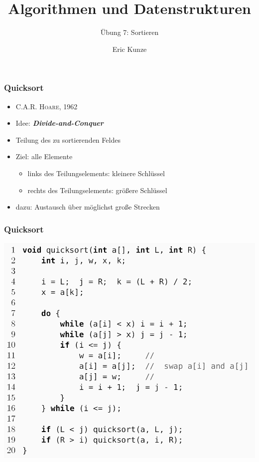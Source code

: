 \documentclass{beamer}
\begin{document}
	
	\title{Algorithmen und Datenstrukturen}
	\subtitle{Übung 7: Sortieren}
	\author{Eric Kunze}
	\date{} %

	\maketitle


\begin{frame} \frametitle{Quicksort}
	\begin{itemize}
		\item \textsc{C.A.R. Hoare}, 1962
		\item Idee: \textit{\textbf{Divide-and-Conquer}}
		\item Teilung des zu sortierenden Feldes
		\item Ziel: alle Elemente
		\begin{itemize}
			\item links des Teilungselements: kleinere Schlüssel
			\item rechts des Teilungselements: größere Schlüssel
		\end{itemize}
	\item dazu: Austausch über möglichst große Strecken
	\end{itemize}
\end{frame}

\begin{frame} \frametitle{Quicksort}
	\centering
	\includegraphics[height=.95\textheight]{./tut07_quicksort.jpg}
\end{frame}
\end{document}
